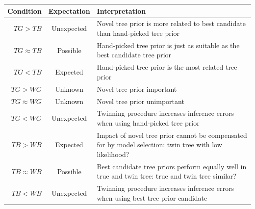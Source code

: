 \begin{table}
  \begin{tabular}{ | r | c | p{9cm} | }
    \hline
    \textbf{Condition} & \textbf{Expectation} & \textbf{Interpretation} \\ 
    \hline
    \textbf{$TG > TB$}       & Unexpected & Novel tree prior is more related to 
      best candidate than hand-picked tree prior \\
    \textbf{$TG \approx TB$} & Possible   & Hand-picked tree prior is just as 
      suitable as the best candidate tree prior \\
    \textbf{$TG < TB$}       & Expected   & Hand-picked tree prior is the most 
      related tree prior \\
    \hline
    \textbf{$TG > WG$}       & Unknown    & Novel tree prior important \\
    \textbf{$TG \approx WG$} & Unknown    & Novel tree prior unimportant \\
    \textbf{$TG < WG$}       & Unexpected & Twinning procedure increases 
      inference errors when using hand-picked tree prior \\
    \hline
    \textbf{$TB > WB$}       & Expected   & Impact of novel tree prior cannot 
      be compensated for by model selection: twin tree with low likelihood? \\
    \textbf{$TB \approx WB$} & Possible   & Best candidate tree priors perform 
      equally well in true and twin tree: true and twin tree similar? \\
    \textbf{$TB < WB$}       & Unexpected & Twinning procedure increases 
      inference errors  when using best tree prior candidate \\

\end{tabular}
\end{table}
